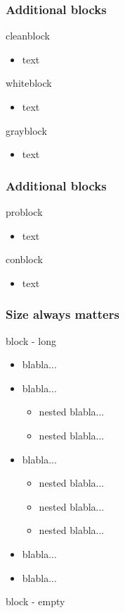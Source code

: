 \documentclass[t,compress,aspectratio=169]{beamer}
\begin{document}
\begin{frame}
\frametitle{Additional blocks}
\begin{cleanblock}{cleanblock}
\begin{itemize} \item text \end{itemize}
\end{cleanblock}
\begin{whiteblock}{whiteblock}
\begin{itemize} \item text \end{itemize}
\end{whiteblock}
\begin{grayblock}{grayblock}
\begin{itemize} \item text \end{itemize}
\end{grayblock}
\end{frame}

\begin{frame}
\frametitle{Additional blocks}
\begin{problock}{problock}
\begin{itemize} \item text \end{itemize}
\end{problock}
\begin{conblock}{conblock}
\begin{itemize} \item text \end{itemize}
\end{conblock}
\end{frame}

\begin{frame}
\frametitle{Size always matters}
\begin{block}{block - long}
  \begin{itemize}
    \item blabla...
    \item blabla...
    \begin{itemize}
      \item nested blabla...
      \item nested blabla...
    \end{itemize}
    \item blabla...
    \begin{itemize}
    \item nested blabla...
    \item nested blabla...
    \item nested blabla...
    \end{itemize}
    \item blabla...
    \item blabla...
  \end{itemize}
\end{block}
\begin{block}{block - empty}
\end{block}
\end{frame}
\end{document}
